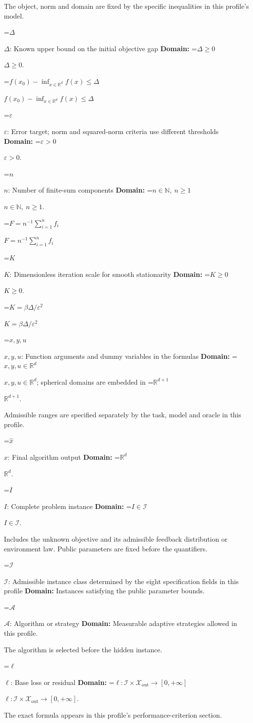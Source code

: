 \documentclass[10pt,a4paper]{article}
\newcommand{\AtlasMath}[1]{\par\begingroup\centering\setbox0=\hbox{$\displaystyle #1$}\ifdim\wd0>1.4\linewidth\typeout{ATLAS WIDE FORMULA: \the\wd0}\fi\ifdim\wd0>\linewidth\resizebox{\linewidth}{!}{\box0}\else\box0\fi\par\endgroup}
\newcommand{\AtlasInlineMath}[1]{\begingroup\setbox0=\hbox{$#1$}\ifdim\wd0>.4\linewidth\endgroup\AtlasMath{#1}\else\endgroup$#1$\fi}
\begin{document}
The object, norm and domain are fixed by the specific inequalities in this profile's model.

\AtlasInlineMath{\Delta}: Known upper bound on the initial objective gap \textbf{Domain:} \AtlasInlineMath{\Delta\ge0}.

\AtlasInlineMath{f(x_0)-\inf_{x\in\mathbb{R}^d}f(x)\le\Delta}

\AtlasInlineMath{\varepsilon}: Error target; norm and squared-norm criteria use different thresholds \textbf{Domain:} \AtlasInlineMath{\varepsilon>0}.

\AtlasInlineMath{n}: Number of finite-sum components \textbf{Domain:} \AtlasInlineMath{n\in\mathbb{N},\ n\ge1}.

\AtlasInlineMath{F=n^{-1}\sum_{i=1}^n f_i}

\AtlasInlineMath{K}: Dimensionless iteration scale for smooth stationarity \textbf{Domain:} \AtlasInlineMath{K\ge0}.

\AtlasInlineMath{K=\beta\Delta/\varepsilon^2}

\AtlasInlineMath{x,y,u}: Function arguments and dummy variables in the formulas \textbf{Domain:} \AtlasInlineMath{x,y,u\in\mathbb{R}^d}; spherical domains are embedded in \AtlasInlineMath{\mathbb{R}^{d+1}}.

Admissible ranges are specified separately by the task, model and oracle in this profile.

\AtlasInlineMath{\widehat{x}}: Final algorithm output \textbf{Domain:} \AtlasInlineMath{\mathbb{R}^d}.

\AtlasInlineMath{I}: Complete problem instance \textbf{Domain:} \AtlasInlineMath{I\in\mathcal{I}}.

Includes the unknown objective and its admissible feedback distribution or environment law. Public parameters are fixed before the quantifiers.

\AtlasInlineMath{\mathcal{I}}: Admissible instance class determined by the eight specification fields in this profile \textbf{Domain:} Instances satisfying the public parameter bounds.

\AtlasInlineMath{\mathcal{A}}: Algorithm or strategy \textbf{Domain:} Measurable adaptive strategies allowed in this profile.

The algorithm is selected before the hidden instance.

\AtlasInlineMath{\ell}: Base loss or residual \textbf{Domain:} \AtlasInlineMath{\ell:\mathcal{I}\times\mathcal{X}_{\mathrm{out}}\to[0,+\infty]}.

The exact formula appears in this profile's performance-criterion section.
\end{document}
